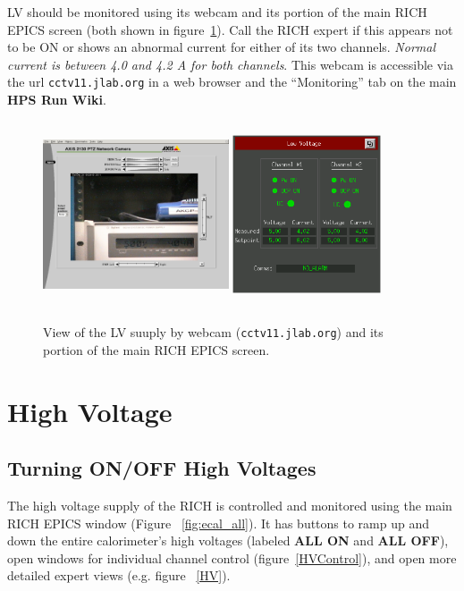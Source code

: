 \documentclass[12pt]{article}
\begin{document}
LV should be monitored using its webcam and its portion of the main RICH EPICS screen (both shown in figure~\ref{LVCam}). Call the RICH expert if this appears not to be ON or shows an abnormal current for either of its two channels.  {\em Normal current is between 4.0 and 4.2 A for both channels}.  This webcam is accessible via the url \texttt{cctv11.jlab.org} in a web browser and the ``Monitoring'' tab on the main {\bf HPS Run Wiki}.
\begin{figure}[htbp]
\center
\includegraphics[width=0.49\textwidth,height=5.5cm]{pics/LVCam_2014_12_20.png}
\includegraphics[width=0.39\textwidth,height=5.5cm]{pics/lvnovice.png}
\caption{ \label{LVCam} View of the LV suuply by webcam (\texttt{cctv11.jlab.org}) and its portion of the main RICH EPICS screen.}
\end{figure}

{\color{blue}

\section{High Voltage}
}
      \subsection{Turning ON/OFF High Voltages}

      The high voltage supply of the RICH is controlled and monitored using the main RICH
EPICS window (Figure ~\ref{fig:ecal_all}).  It has buttons to ramp up and down the entire 
calorimeter's high voltages (labeled {\bf ALL ON} and {\bf ALL OFF}), open windows for
individual channel control (figure~\ref{HVControl}), and open more detailed expert views 
(e.g. figure ~\ref{HV}).
\end{document}
